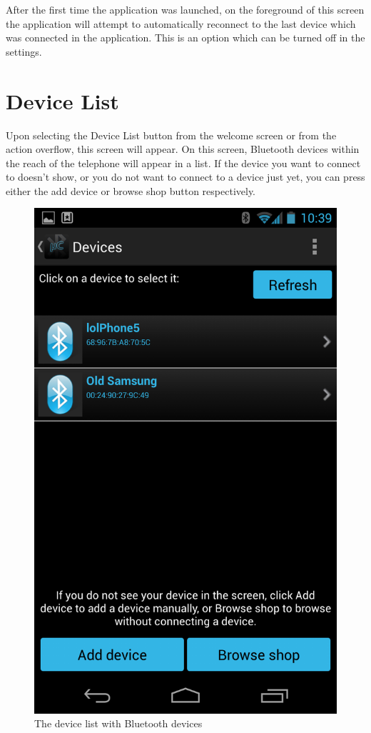 After the first time the application was launched, on the foreground of this screen the application will attempt to automatically reconnect to the last device which was connected in the application. This is an option which can be turned off in the settings. 

\chapter{Device List}
Upon selecting the Device List button from the welcome screen or from the action overflow, this screen will appear. On this screen, Bluetooth devices within the reach of the telephone will appear in a list. If the device you want to connect to doesn't show, or you do not want to connect to a device just yet, you can press either the add device or browse shop button respectively.\\
\newline
\begin{figure}[H]
	\centering
	\includegraphics[scale = 0.3]{images/Screenshots/device_list.png}
	\caption{The device list with Bluetooth devices}
\end{figure}
